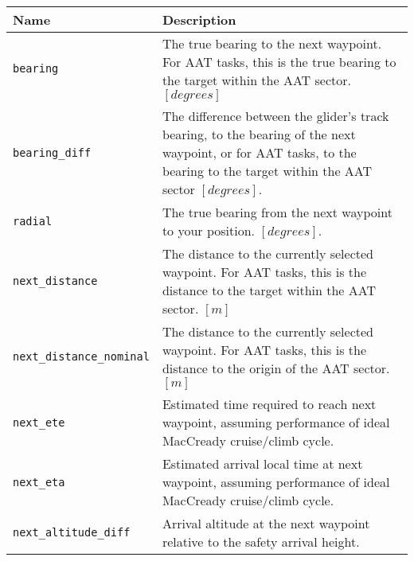 \begin{maxipage}
\begin{tabularx}{1.9\textwidth}{l|X}
Name & Description \\
\hline\hline

\verb|bearing| & The true bearing to the next waypoint. 
For AAT tasks, this is the true \newline bearing 
to the target within the AAT sector. $[{degrees}]$\\

\hline

\verb|bearing_diff| & The difference between the glider's track bearing, 
to the bearing of \newline the next waypoint, or for AAT tasks, to the bearing 
to the target within \newline the AAT sector $[{degrees}]$.\\

\hline

\verb|radial| & The true bearing from the next waypoint 
to your position. $[{degrees}]$. \\

\hline

\verb|next_distance| & The distance to the currently selected waypoint. 
For AAT tasks, this \newline is the distance to the target within the AAT sector.
$[{m}]$ \\

\hline

\verb|next_distance_nominal| & The distance to the currently selected waypoint. 
For AAT tasks, this \newline is the distance to the origin of the AAT sector.
$[{m}]$ \\

\hline

\verb|next_ete| &  Estimated time required to reach next waypoint, 
assuming \newline performance of ideal MacCready cruise/climb cycle.\\

\hline

\verb|next_eta| & Estimated arrival local time at next waypoint, 
assuming performance \newline of ideal MacCready cruise/climb cycle. \\

\hline

\verb|next_altitude_diff| & Arrival altitude at the next waypoint relative 
to the safety arrival height. \\


\end{tabularx}
\end{maxipage}
